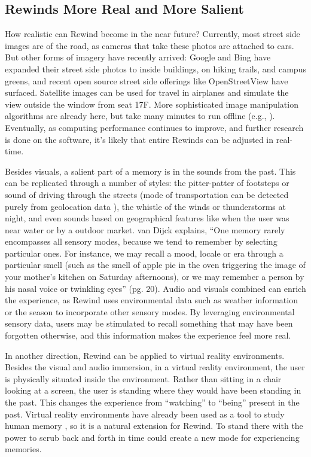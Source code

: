 \documentclass{sigchi}
\begin{document}
\subsection{Rewinds More Real and More Salient}

How realistic can Rewind become in the near future? Currently, most street side images are of the road, as cameras that take these photos are attached to cars. But other forms of imagery have recently arrived: Google and Bing have expanded their street side photos to inside buildings, on hiking trails, and campus greens, and recent open source street side offerings like OpenStreetView have surfaced. Satellite images can be used for travel in airplanes and simulate the view outside the window from seat 17F. More sophisticated image manipulation algorithms are already here, but take many minutes to run offline (e.g., \cite{laffont2014transient,shih2013data}). Eventually, as computing performance continues to improve, and further research is done on the software, it's likely that entire Rewinds can be adjusted in real-time.

Besides visuals, a salient part of a memory is in the sounds from the past. This can be replicated through a number of styles: the pitter-patter of footsteps or sound of driving through the streets (mode of transportation can be detected purely from geolocation data \cite{zheng2008learning}), the whistle of the winds or thunderstorms at night, and even sounds based on geographical features like when the user was near water or by a outdoor market. van Dijck explains, ``One memory rarely encompasses all sensory modes, because we tend to remember by selecting particular ones. For instance, we may recall a mood, locale or era through a particular smell (such as the smell of apple pie in the oven triggering the image of your mother's kitchen on Saturday afternoons), or we may remember a person by his nasal voice or twinkling eyes'' \cite{van2007mediated} (pg. 20). Audio and visuals combined can enrich the experience, as Rewind uses environmental data such as weather information or the season to incorporate other sensory modes. By leveraging environmental sensory data, users may be stimulated to recall something that may have been forgotten otherwise, and this information makes the experience feel more real.

In another direction, Rewind can be applied to virtual reality environments. Besides the visual and audio immersion, in a virtual reality environment, the user is physically situated inside the environment. Rather than sitting in a chair looking at a screen, the user is standing where they would have been standing in the past. This changes the experience from ``watching'' to ``being'' present in the past. Virtual reality environments have already been used as a tool to study human memory \cite{gamberini2000virtual}, so it is a natural extension for Rewind. To stand there with the power to scrub back and forth in time could create a new mode for experiencing memories.
\end{document}
